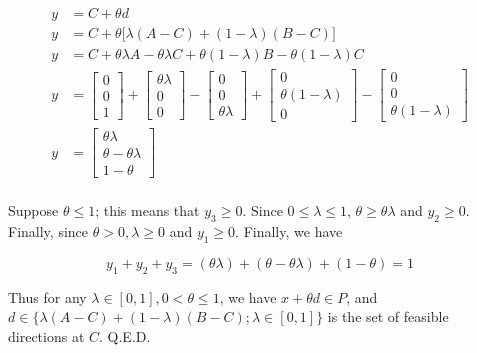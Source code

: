 \documentclass[11pt]{article}
\begin{document}
\begin{equation}
\begin{split}
y &= C + \theta d\\
y &= C + \theta\bigl[\lambda (A-C) + (1-\lambda) (B-C)\bigr]\\
y &= C + \theta\lambda A - \theta\lambda C + \theta(1-\lambda)B - \theta(1-\lambda)C \\
y &= \begin{bmatrix}0\\0\\1\end{bmatrix} + \begin{bmatrix}\theta\lambda\\0\\0\end{bmatrix} - \begin{bmatrix}0\\0\\\theta\lambda\end{bmatrix} + \begin{bmatrix}0\\\theta(1-\lambda)\\0\end{bmatrix} - \begin{bmatrix}0\\0\\\theta(1-\lambda)\end{bmatrix} \\
y &= \begin{bmatrix}\theta\lambda\\\theta-\theta\lambda\\1-\theta\end{bmatrix}\\
\end{split}
\end{equation}

Suppose $\theta\leq 1$; this means that $y_3\geq 0$. Since $0\leq \lambda \leq 1$, $\theta \geq \theta \lambda$ and $y_2\geq 0$. Finally, since $\theta>0, \lambda \geq 0$ and $y_1\geq 0$. Finally, we have 

$$
y_1+y_2+y_3=(\theta\lambda) + (\theta - \theta\lambda) + (1-\theta)=1
$$

Thus for any $\lambda\in[0,1], 0<\theta\leq 1$, we have $x+\theta d\in P$, and $d\in\{\lambda(A-C) + (1-\lambda) (B-C); \lambda\in[0, 1]\}$ is the set of feasible directions at $C$. Q.E.D.
\end{document}
